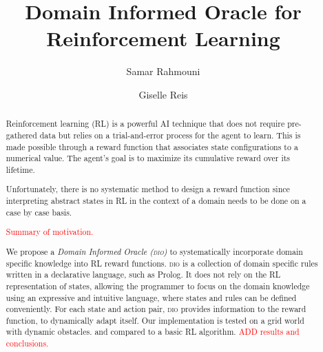 \documentclass[acmsmall]{acmart}
\theoremstyle{definition}
\newcommand{\dio}{\textsc{dio}}
\begin{document}
\title{Domain Informed Oracle for Reinforcement Learning}

\author{Samar Rahmouni}

\author{Giselle Reis}




\begin{abstract}

  Reinforcement learning (RL) is a powerful AI
  technique that does not
  require pre-gathered data but relies on a trial-and-error process
  for the agent to learn. 
  This is made possible through a reward function that associates
  state configurations to a numerical value. 
  The agent's goal is to maximize its cumulative reward over its
  lifetime. 

  Unfortunately, there is no systematic method to design a reward
  function since interpreting abstract states in RL in
  the context of a domain needs to be done on a case by case basis.

  \textcolor{red}{Summary of motivation.}
  
  We propose a \emph{Domain Informed Oracle (\dio{})} to
  systematically incorporate domain specific knowledge into RL
  reward functions.
  \dio{} is a collection of domain specific rules written in a
  declarative language, such as Prolog.
  It does not rely on the RL representation of states, allowing the
  programmer to focus on the domain knowledge using an
  expressive and intuitive language, where states and rules can
  be defined conveniently.
  For each state and action pair, \dio{} provides
  information to the reward
  function, to dynamically adapt itself.
  Our implementation is tested on a grid world with dynamic obstacles.
  and compared to a basic RL algorithm. 
  \textcolor{red}{ADD results and conclusions.}
  

\end{abstract}
\end{document}
